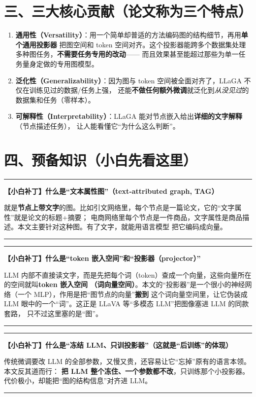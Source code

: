 \documentclass[11pt,UTF8,fontset=fandol]{ctexart}
\newenvironment{tip}[1]{%
  \par\smallskip\noindent\rule{\linewidth}{0.4pt}\par\nobreak
  \noindent\textbf{【小白补丁】#1}\par\nobreak\noindent\ignorespaces
}{%
  \par\noindent\rule{\linewidth}{0.4pt}\par\smallskip
}
\begin{document}
\section{三、三大核心贡献（论文称为三个特点）}
\begin{enumerate}[leftmargin=2em]
  \item \textbf{通用性（Versatility）}：用一个简单却普适的方法编码图的结构细节，再用\textbf{单个通用投影器}
        把图空间和 token 空间对齐。这个投影器能跨多个数据集处理多种图任务，\textbf{不需要任务专用的改动}——
        而且效果甚至能超过那些为单一任务量身定做的专用图模型。
  \item \textbf{泛化性（Generalizability）}：因为图与 token 空间被全面对齐了，LLaGA 不仅在训练见过的数据/任务上强，
        还能\textbf{不做任何额外微调}就泛化到\emph{从没见过}的数据集和任务（零样本）。
  \item \textbf{可解释性（Interpretability）}：LLaGA 能对节点嵌入给出\textbf{详细的文字解释}（节点描述任务），
        让人能看懂它“为什么这么判断”。
\end{enumerate}

\section{四、预备知识（小白先看这里）}

\begin{tip}{什么是“文本属性图”（text-attributed graph, TAG）}
就是\textbf{节点上带文字}的图。比如引文网络里，每个节点是一篇论文，它的“文字属性”就是论文的标题+摘要；
电商网络里每个节点是一件商品，文字属性是商品描述。本文主要针对这种图。有了文字，就能用语言模型
把它编码成向量。
\end{tip}

\begin{tip}{什么是“token 嵌入空间”和“投影器（projector）”}
LLM 内部不直接读文字，而是先把每个词（token）查成一个向量，这些向量所在的空间就叫\textbf{token 嵌入空间
（词向量空间）}。本文的“投影器”是一个很小的神经网络（一个 MLP），作用是把“图节点的向量”\textbf{搬到}
这个词向量空间里，让它伪装成 LLM 眼中的一个“词”。这正是 LLaVA 等“多模态 LLM”把图像塞进 LLM 的同款套路，
只不过这里塞的是“图”。
\end{tip}

\begin{tip}{什么是“冻结 LLM、只训投影器”（这就是“后训练”的体现）}
传统微调要改 LLM 的全部参数，又慢又贵，还容易让它“忘掉”原有的语言本领。本文反其道而行：
\textbf{把 LLM 整个冻住、一个参数都不改}，只训练那个小投影器。代价极小，却能把“图的结构信息”对齐进 LLM。
\end{tip}
\end{document}
